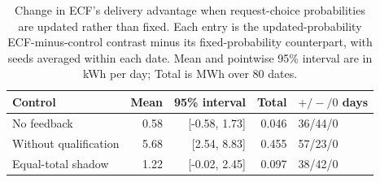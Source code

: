 \documentclass[11pt]{article}
\begin{document}
\begin{table}[!htbp]
\centering
\caption{Change in ECF's delivery advantage when request-choice probabilities are updated rather than fixed. Each entry is the updated-probability ECF-minus-control contrast minus its fixed-probability counterpart, with seeds averaged within each date. Mean and pointwise 95\% interval are in kWh per day; Total is MWh over 80 dates.}
\label{tab:supp_adapt_interaction}
\small
\begin{tabular}{@{}lrrrl@{}}
\toprule
Control & Mean & 95\% interval & Total & $+/-/0$ days \\
\midrule
No feedback & 0.58 & [-0.58, 1.73] & 0.046 & 36/44/0 \\
Without qualification & 5.68 & [2.54, 8.83] & 0.455 & 57/23/0 \\
Equal-total shadow & 1.22 & [-0.02, 2.45] & 0.097 & 38/42/0 \\
\bottomrule
\end{tabular}
\end{table}
\end{document}
